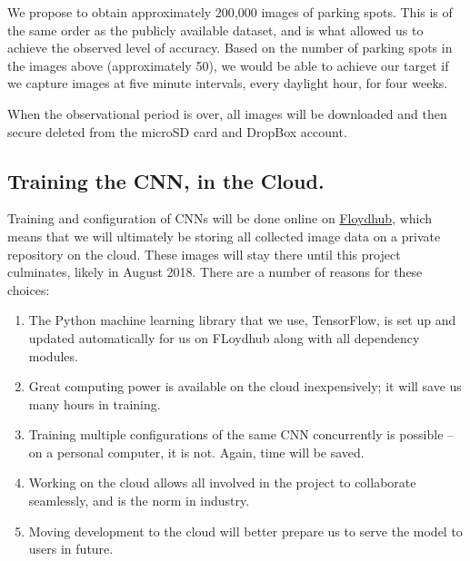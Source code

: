 \documentclass[]{article}
\begin{document}
We propose to obtain approximately 200,000 images of parking spots. This is of
the same order as the publicly available dataset, and is what allowed us to
achieve the observed level of accuracy. Based on the number of parking spots
in the images above (approximately 50), we would be able to achieve our target
if we capture images at five minute intervals, every daylight hour, for four
weeks. 

%
When the observational period is over, all images will be downloaded and
then secure deleted from the microSD card and DropBox account. 
%
%
%
\subsection{Training the CNN, in the Cloud.}\label{training-the-cnn-on-the-cloud.}

Training and configuration of CNNs will be done online on
\href{https://www.floydhub.com}{Floydhub}, which means that we will ultimately
be storing all collected image data on a private repository on the cloud. These
images will stay there until this project culminates, likely in August 2018.
There are a number of reasons for these choices:

\begin{enumerate}
  \item The Python machine learning library that we use, TensorFlow, is set up
and updated automatically for us on FLoydhub along with all dependency modules.
  \item Great computing power is available on the cloud inexpensively; it will
  save us many hours in training.
  \item Training multiple configurations of the same CNN concurrently is
  possible -- on a personal computer, it is not. Again, time will be saved.
  \item Working on the cloud allows all involved in the project to collaborate
  seamlessly, and is the norm in industry.
  \item Moving development to the cloud will better prepare us to serve the
model to users in future.
\end{enumerate}
\end{document}
